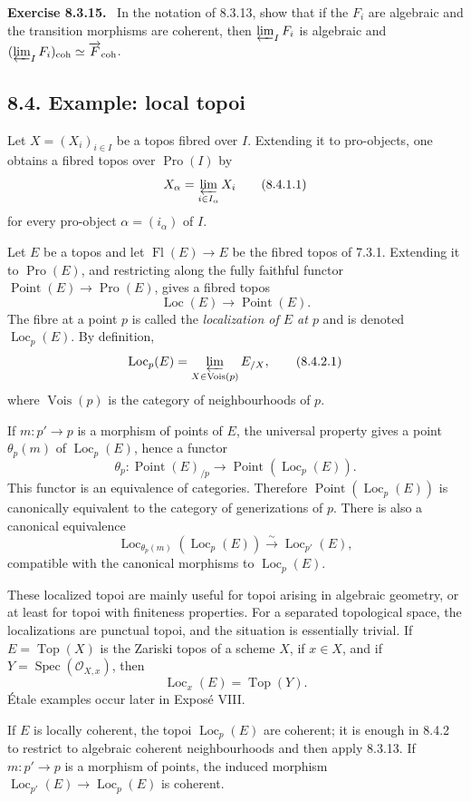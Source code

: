 \documentclass[11pt]{article}
\newcommand{\Top}{\operatorname{Top}}
\newcommand{\Pro}{\operatorname{Pro}}
\newcommand{\Point}{\operatorname{Point}}
\newcommand{\Spec}{\operatorname{Spec}}
\newcommand{\Loc}{\operatorname{Loc}}
\newcommand{\Vois}{\operatorname{Vois}}
\newcommand{\coh}{\mathrm{coh}}
\newenvironment{statement}[1]{\par\medskip\noindent\textbf{#1.}\ }{\par\medskip}
\begin{document}
\begin{statement}{Exercise 8.3.15}
In the notation of 8.3.13, show that if the \(F_i\) are algebraic and the transition morphisms are coherent, then \(\varprojlim_I F_i\) is algebraic and \((\varprojlim_I F_i)_{\coh}\simeq\overrightarrow{F}_{\coh}\).
\end{statement}

\subsection*{8.4. Example: local topoi}

Let \(X=(X_i)_{i\in I}\) be a topos fibred over \(I\). Extending it to pro-objects, one obtains a fibred topos over \(\Pro(I)\) by
\[
 X_{\alpha}=\varprojlim_{i\in I_{\alpha}}X_i \tag{8.4.1.1}
\]
for every pro-object \(\alpha=(i_\alpha)\) of \(I\).

Let \(E\) be a topos and let \(\operatorname{Fl}(E)\to E\) be the fibred topos of 7.3.1. Extending it to \(\Pro(E)\), and restricting along the fully faithful functor \(\Point(E)\to\Pro(E)\), gives a fibred topos
\[
 \Loc(E)\to\Point(E).
\]
The fibre at a point \(p\) is called the \emph{localization of \(E\) at \(p\)} and is denoted \(\Loc_p(E)\). By definition,
\[
 \Loc_p(E)=\varprojlim_{X\in\Vois(p)}E_{/X}, \tag{8.4.2.1}
\]
where \(\Vois(p)\) is the category of neighbourhoods of \(p\).

If \(m:p'\to p\) is a morphism of points of \(E\), the universal property gives a point \(\theta_p(m)\) of \(\Loc_p(E)\), hence a functor
\[
 \theta_p:\Point(E)_{/p}\to\Point(\Loc_p(E)). \tag{8.4.3.1}
\]
This functor is an equivalence of categories. Therefore \(\Point(\Loc_p(E))\) is canonically equivalent to the category of generizations of \(p\). There is also a canonical equivalence
\[
 \Loc_{\theta_p(m)}(\Loc_p(E))\xrightarrow{\sim}\Loc_{p'}(E),
\]
compatible with the canonical morphisms to \(\Loc_p(E)\).

These localized topoi are mainly useful for topoi arising in algebraic geometry, or at least for topoi with finiteness properties. For a separated topological space, the localizations are punctual topoi, and the situation is essentially trivial. If \(E=\Top(X)\) is the Zariski topos of a scheme \(X\), if \(x\in X\), and if \(Y=\Spec(\mathcal{O}_{X,x})\), then
\[
 \Loc_x(E)=\Top(Y).
\]
Étale examples occur later in Exposé VIII.

If \(E\) is locally coherent, the topoi \(\Loc_p(E)\) are coherent; it is enough in 8.4.2 to restrict to algebraic coherent neighbourhoods and then apply 8.3.13. If \(m:p'\to p\) is a morphism of points, the induced morphism \(\Loc_{p'}(E)\to\Loc_p(E)\) is coherent.
\end{document}
